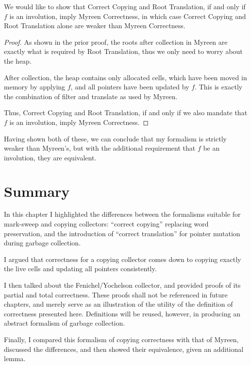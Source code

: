 \begin{theorem}
  We would like to show that Correct Copying and Root Translation, if
  and only if $f$ is an involution, imply Myreen Correctness, in which
  case Correct Copying and Root Translation alone are weaker than
  Myreen Correctness.

  \begin{proof}
    As shown in the prior proof, the roots after collection in Myreen
    are exactly what is required by Root Translation, thus we only
    need to worry about the heap.

    After collection, the heap contains only allocated cells, which
    have been moved in memory by applying $f$, and all pointers have
    been updated by $f$. This is exactly the combination of filter and
    translate as used by Myreen.

    Thus, Correct Copying and Root Translation, if and only if we also
    mandate that $f$ is an involution, imply Myreen Correctness.
  \end{proof}
\end{theorem}

Having shown both of these, we can conclude that my formalism is
strictly weaker than Myreen's, but with the additional requirement
that $f$ be an involution, they are equivalent.

\section{Summary}
\label{sec:copying-summary}

In this chapter I highlighted the differences between the formalisms
suitable for \gls{mark-sweep} and \gls{copying} \glspl{collector}:
``correct copying'' replacing word preservation, and the introduction
of ``correct translation'' for \gls{pointer} mutation during
\gls{garbage collection}.

I argued that correctness for a \gls{copying} \gls{collector} comes
down to copying exactly the \glspl{live cell} and updating all
\glspl{pointer} consistently.

I then talked about the Fenichel/Yochelson\cite{Fenichel69} collector,
and provided proofs of its partial and total correctness. These proofs
shall not be referenced in future chapters, and merely serve as an
illustration of the utility of the definition of correctness presented
here. Definitions will be reused, however, in producing an abstract
formalism of garbage collection.

Finally, I compared this formalism of copying correctness with that of
Myreen\cite{Myreen10}, discussed the differences, and then showed
their equivalence, given an additional lemma.
